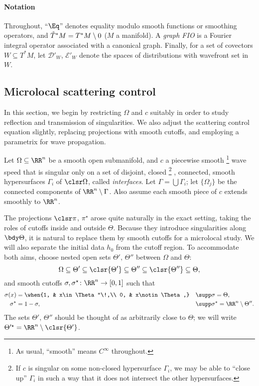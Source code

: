 \documentclass[10pt]{article}
\theoremstyle{plain}
\theoremstyle{definition}
\theoremstyle{remark}
\numberwithin{theorem}{section}
\numberwithin{example}{section}
\numberwithin{equation}{section}
\numberwithin{figure}{section}
\newcommand\To{\smash{\mathring T}\vphantom{T}}			%
\newcommand\eqml{\Eq}					%
\begin{document}
\paragraph{Notation}

Throughout, ``$\eqml$'' denotes equality modulo smooth functions or smoothing operators, and $\To^*M=T^*M\setminus 0$ ($M$ a manifold). A \emph{graph FIO} is a Fourier integral operator associated with a canonical graph. Finally, for a set of covectors $W\subseteq T^*M$, let $\mathcal D'_W$, $\mathcal E'_W$ denote the spaces of distributions with wavefront set in $W$.


\subsection{Microlocal scattering control}	\label{s:ml-maf}

In this section, we begin by restricting $\Omega$ and $c$ suitably in order to study reflection and transmission of singularities. We also adjust the scattering control equation slightly, replacing projections with smooth cutoffs, and employing a parametrix for wave propagation.

Let $\Omega\subseteq\RR^n$ be a smooth open submanifold, and $c$ a piecewise smooth%
	\footnote{As usual, ``smooth'' means $C^\infty$ throughout.}
wave speed that is singular only on a set of disjoint, closed%
		\footnote{If $c$ is singular on some non-closed hypersurface $\Gamma_i$, we may be able to ``close up'' $\Gamma_i$ in such a way that it does not intersect the other hypersurfaces.}%
, connected, smooth hypersurfaces $\Gamma_i$ of $\clsr\Omega$, called \emph{interfaces}. Let $\Gamma=\bigcup\Gamma_i$; let $\{\Omega_j\}$ be the connected components of $\RR^n\setminus\Gamma$. Also assume each smooth piece of $c$ extends smoothly to $\RR^n$.

The projections $\clsr\pi$, $\pi^\star$ arose quite naturally in the exact setting, taking the roles of cutoffs inside and outside $\Theta$. Because they introduce singularities along $\bdy\Theta$, it is natural to replace them by smooth cutoffs for a microlocal study. We will also separate the initial data $h_0$ from the cutoff region. To accommodate both aims, choose nested open sets $\Theta',\,\Theta''$ between $\Omega$ and $\Theta$:
\begin{equation}
	\Omega\subseteq\Theta' \subseteq\clsr{\Theta'}\subseteq\Theta''\subseteq\clsr{\Theta''}\subseteq\Theta,
\end{equation} 
and smooth cutoffs $\sigma,\sigma^\star\colon\RR^n\to[0,1]$ such that
%
\begin{align}
	\sigma(x) &= \when{1, & x\in\Theta''\!,\\
				 0, & x\notin\Theta,}
	&
	&\supp\sigma = \Theta,
	\\
	\sigma^\star &= 1 - \sigma,
	&
	&\supp\sigma^\star = \RR^n\setminus\Theta''.
\end{align}
%
The sets $\Theta',\,\Theta''$ should be thought of as arbitrarily close to $\Theta$; we will write $\Theta'^\star=\RR^n\setminus\clsr{\Theta'}$.
\end{document}
